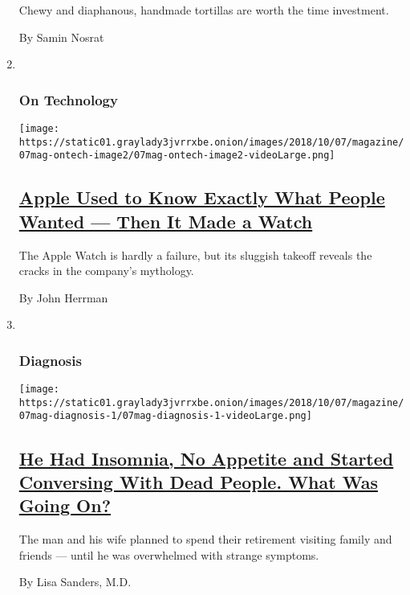 \begin{enumerate}
  Chewy and diaphanous, handmade tortillas are worth the time
  investment.

  By Samin Nosrat
\item ~
  \hypertarget{on-technology}{%
  \subsubsection{On Technology}\label{on-technology}}

  \texttt{[image: https://static01.graylady3jvrrxbe.onion/images/2018/10/07/magazine/07mag-ontech-image2/07mag-ontech-image2-videoLarge.png]}

  \hypertarget{apple-used-to-know-exactly-what-people-wanted--then-it-made-a-watch}{%
  \subsection{\texorpdfstring{\href{/2018/10/03/magazine/apple-watch-data-industry.html}{Apple
  Used to Know Exactly What People Wanted --- Then It Made a
  Watch}}{Apple Used to Know Exactly What People Wanted --- Then It Made a Watch}}\label{apple-used-to-know-exactly-what-people-wanted--then-it-made-a-watch}}

  The Apple Watch is hardly a failure, but its sluggish takeoff reveals
  the cracks in the company's mythology.

  By John Herrman
\item ~
  \hypertarget{diagnosis}{%
  \subsubsection{Diagnosis}\label{diagnosis}}

  \texttt{[image: https://static01.graylady3jvrrxbe.onion/images/2018/10/07/magazine/07mag-diagnosis-1/07mag-diagnosis-1-videoLarge.png]}

  \hypertarget{he-had-insomnia-no-appetite-and-started-conversing-with-dead-people-what-was-going-on}{%
  \subsection{\texorpdfstring{\href{/2018/10/02/magazine/he-had-insomnia-no-appetite-and-started-conversing-with-dead-people-what-was-going-on.html}{He
  Had Insomnia, No Appetite and Started Conversing With Dead People.
  What Was Going
  On?}}{He Had Insomnia, No Appetite and Started Conversing With Dead People. What Was Going On?}}\label{he-had-insomnia-no-appetite-and-started-conversing-with-dead-people-what-was-going-on}}

  The man and his wife planned to spend their retirement visiting family
  and friends --- until he was overwhelmed with strange symptoms.

  By Lisa Sanders, M.D.
\end{enumerate}


